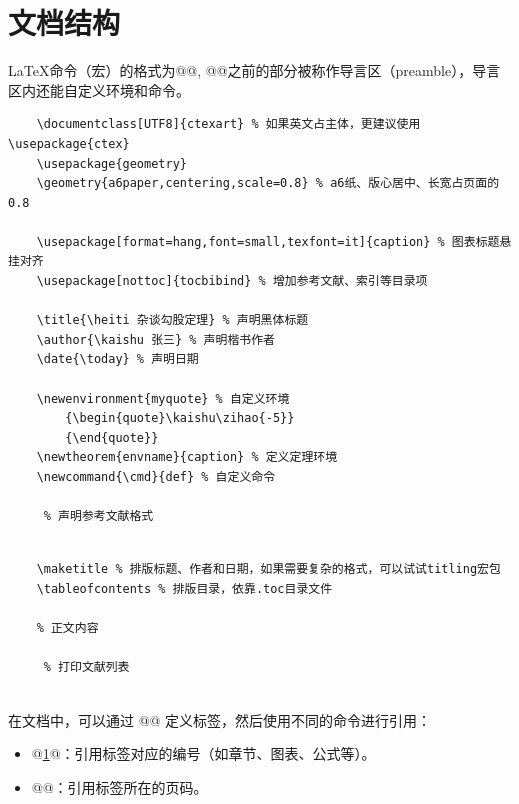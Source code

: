 \section{文档结构}
\LaTeX 命令（宏）的格式为@@,
@@之前的部分被称作导言区（preamble），导言区内还能自定义环境和命令。

\begin{code}[title=导言区示例]
	\begin{verbatim}
	\documentclass[UTF8]{ctexart} % 如果英文占主体，更建议使用\usepackage{ctex}
	\usepackage{geometry}
	\geometry{a6paper,centering,scale=0.8} % a6纸、版心居中、长宽占页面的0.8

	\usepackage[format=hang,font=small,texfont=it]{caption} % 图表标题悬挂对齐
	\usepackage[nottoc]{tocbibind} % 增加参考文献、索引等目录项

	\title{\heiti 杂谈勾股定理} % 声明黑体标题
	\author{\kaishu 张三} % 声明楷书作者
	\date{\today} % 声明日期

	\newenvironment{myquote} % 自定义环境
		{\begin{quote}\kaishu\zihao{-5}}
		{\end{quote}}
	\newtheorem{envname}{caption} % 定义定理环境
	\newcommand{\cmd}{def} % 自定义命令

	 % 声明参考文献格式
	\end{verbatim}
\end{code}
\begin{code}[title=正文示例]
	\begin{verbatim}
	
	\maketitle % 排版标题、作者和日期，如果需要复杂的格式，可以试试titling宏包
	\tableofcontents % 排版目录，依靠.toc目录文件

	% 正文内容

	 % 打印文献列表
	
	\end{verbatim}
\end{code}

在文档中，可以通过 @\label{}@ 定义标签，然后使用不同的命令进行引用：
\begin{itemize}[itemsep=0pt, parsep=0pt]
	\item @\ref{}@：引用标签对应的编号（如章节、图表、公式等）。
	\item @\pageref{}@：引用标签所在的页码。
\end{itemize}


